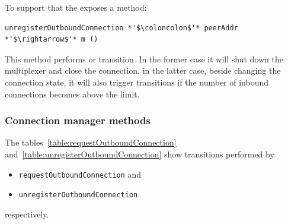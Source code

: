 To support that the \connmngr{} exposes a method:

\begin{lstlisting}
unregisterOutboundConnection *'$\coloncolon$'* peerAddr *'$\rightarrow$'* m ()
\end{lstlisting}
This method performs \DemotedToColdUniLoc{} or
\DemotedToColdDupLoc{} transition. In the former case it will shut down the
multiplexer and close the \TCP{} connection, in the latter case, beside
changing the connection state, it will also trigger \Prune{} transitions if
the number of inbound connections becomes above the limit.

\subsubsection{Connection manager methods}

The tables~\ref{table:requestOutboundConnection}
and~\ref{table:unregisterOutboundConnection} show transitions performed by
\begin{itemize}
  \item \texttt{requestOutboundConnection} and
  \item \texttt{unregisterOutboundConnection}
\end{itemize}
respectively.

